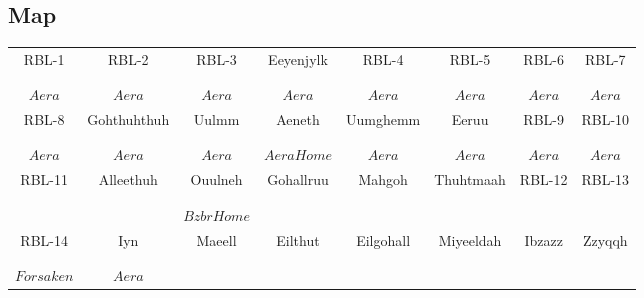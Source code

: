 \subsection{Map}
\begin{table}[h]
\small{
\begin{center}
\begin{tabular}{|c|c|c|c|c|c|c|c|}
\hline
RBL-1&		RBL-2&		RBL-3&		Eeyenjylk&	RBL-4&		RBL-5&		RBL-6&		RBL-7\\ 
 &               &               &               &               &               &               & \\
 &               &               &               &               &               &               & \\
\(Aera\)&       \(Aera\)&       \(Aera\)&       \(Aera\)&       \(Aera\)&       \(Aera\)&       \(Aera\)&       \(Aera\)\\ \hline
RBL-8&		Gohthuhthuh&	Uulmm&		Aeneth&		Uumghemm&	Eeruu&		RBL-9&		RBL-10 \\
 &               &               &               &               &               &               & \\
 &               &               &               &               &               &               & \\
\(Aera\)&       \(Aera\)&       \(Aera\)&       \(Aera Home\)&  \(Aera\)&       \(Aera\)&       \(Aera\)&       \(Aera\)\\ \hline
RBL-11&		Alleethuh&	Ouulneh&	Gohallruu&	Mahgoh&		Thuhtmaah&	RBL-12&		RBL-13 \\
 &               &               &               &               &               &               & \\
 &               &               &               &               &               &               & \\
 &               &              \(Bzbr Home\)&               &               &               &               & \\ \hline
RBL-14&		Iyn&		Maeell&		Eilthut&	Eilgohall&	Miyeeldah&	Ibzazz&		Zzyqqh \\
 &               &               &               &               &               &               & \\
 &               &               &               &               &               &               & \\
\(Forsaken\)&   \(Aera\)&               &               &               &               &               & \\ \hline

\end{tabular}
\end{center}}
\end{table}
